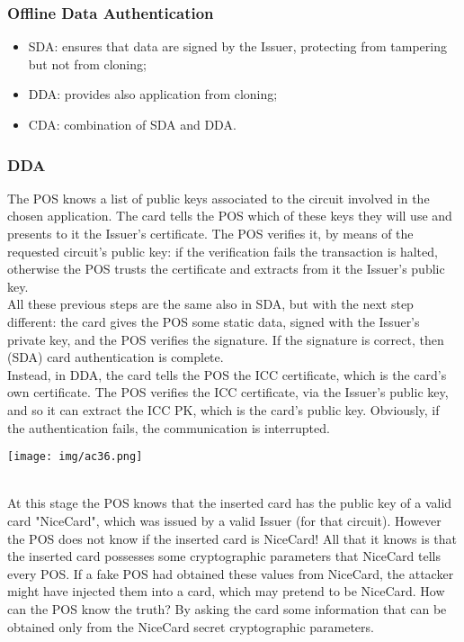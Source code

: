\documentclass[a4paper, 10pt, titlepage]{article}
\begin{document}
\subsubsection{Offline Data Authentication}
\begin{itemize}
\item SDA: ensures that data are signed by the Issuer, protecting from tampering but not from cloning;
\item DDA: provides also application from cloning;
\item CDA: combination of SDA and DDA.
\end{itemize}

\subsubsection*{DDA}
\begin{minipage}{0.5\textwidth}
The POS knows a list of public keys associated to the circuit involved in the chosen application. The card tells the POS which of these keys they will use and presents to it the Issuer's certificate.
The POS verifies it, by means of the requested circuit's public key: if the verification fails the transaction is halted, otherwise the POS trusts the certificate and extracts from it the Issuer's public key. \\
All these previous steps are the same also in SDA, but with the next step different: the card gives the POS some static data, signed with the Issuer's private key, and the POS verifies the signature. If the signature is correct, then (SDA) card authentication is complete. \\
Instead, in DDA, the card tells the POS the ICC certificate, which is the card's own certificate. The POS verifies the ICC certificate, via the Issuer's public key, and so it can extract the ICC PK, which is the card's public key. Obviously, if the authentication fails, the communication is interrupted.
\end{minipage}
\hfill
\begin{minipage}{0.45\textwidth}
\begin{center}
\texttt{[image: img/ac36.png]}
\end{center}
\end{minipage} \medskip\\
At this stage the POS knows that the inserted card has the public key of a valid card "NiceCard", which was issued by a valid Issuer (for that circuit).
However the POS does not know if the inserted card is NiceCard! All that it knows is that the inserted card possesses some cryptographic parameters that NiceCard tells every POS. If a fake POS had obtained these values from NiceCard, the attacker might have injected them into a card, which may pretend to be NiceCard. How can the POS know the truth? By asking the card some information that can be obtained only from the NiceCard secret cryptographic parameters.\\
\end{document}
